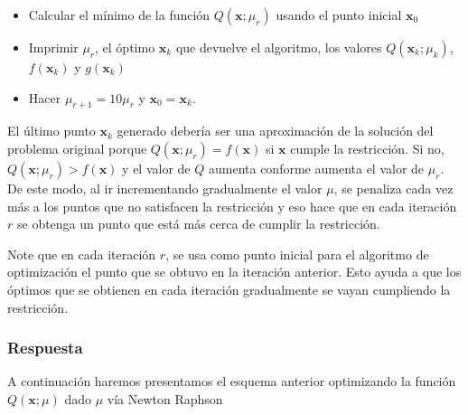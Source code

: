 \documentclass[11pt]{article}
\providecommand{\tightlist}{%
      \setlength{\itemsep}{0pt}\setlength{\parskip}{0pt}}
\begin{document}
\begin{itemize}
\tightlist
\item
  Calcular el mínimo de la función \(Q(\mathbf{x}; \mu_r)\) usando el
  punto inicial \(\mathbf{x}_0\)
\item
  Imprimir \(\mu_r\), el óptimo \(\mathbf{x}_k\) que devuelve el
  algoritmo, los valores \(Q(\mathbf{x}_k; \mu_k)\), \(f(\mathbf{x}_k)\)
  y \(g(\mathbf{x}_k)\)
\item
  Hacer \(\mu_{r+1} = 10\mu_r\) y \(\mathbf{x}_0=\mathbf{x}_k\).
\end{itemize}

El último punto \(\mathbf{x}_k\) generado debería ser una aproximación
de la solución del problema original porque
\(Q(\mathbf{x}; \mu_r)= f(\mathbf{x})\) si \(\mathbf{x}\) cumple la
restricción. Si no, \(Q(\mathbf{x}; \mu_r)> f(\mathbf{x})\) y el valor
de \(Q\) aumenta conforme aumenta el valor de \(\mu_r\). De este modo,
al ir incrementando gradualmente el valor \(\mu\), se penaliza cada vez
más a los puntos que no satisfacen la restricción y eso hace que en cada
iteración \(r\) se obtenga un punto que está más cerca de cumplir la
restricción.

Note que en cada iteración \(r\), se usa como punto inicial para el
algoritmo de optimización el punto que se obtuvo en la iteración
anterior. Esto ayuda a que los óptimos que se obtienen en cada iteración
gradualmente se vayan cumpliendo la restricción.

\hypertarget{respuesta}{%
\subsubsection{Respuesta}\label{respuesta}}

    A continuación haremos presentamos el esquema anterior optimizando la
función \(Q(\mathbf{x};\mu)\) dado \(\mu\) vía Newton Raphson
\end{document}
